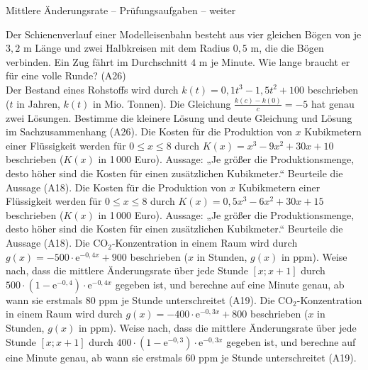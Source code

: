 \begin{aufgabe}{Mittlere Änderungsrate – Prüfungsaufgaben – weiter}
\begin{teile}
\teil Der Schienenverlauf einer Modelleisenbahn besteht aus vier gleichen Bögen von je $3{,}2$ m Länge und zwei Halbkreisen mit dem Radius $0{,}5$ m, die die Bögen verbinden. Ein Zug fährt im Durchschnitt $4$ m je Minute. Wie lange braucht er für eine volle Runde? \hfill (A26) \\ \leerfeld[min]
\teil Der Bestand eines Rohstoffs wird durch $k(t) = 0{,}1t^3 - 1{,}5t^2 + 100$ beschrieben ($t$ in Jahren, $k(t)$ in Mio. Tonnen). Die Gleichung $\frac{k(c) - k(0)}{c} = -5$ hat genau zwei Lösungen. Bestimme die kleinere Lösung und deute Gleichung und Lösung im Sachzusammenhang \hfill (A26).
\teil Die Kosten für die Produktion von $x$ Kubikmetern einer Flüssigkeit werden für $0 \le x \le 8$ durch $K(x) = x^3 - 9x^2 + 30x + 10$ beschrieben ($K(x)$ in 1\,000 Euro). Aussage: „Je größer die Produktionsmenge, desto höher sind die Kosten für einen zusätzlichen Kubikmeter.“ Beurteile die Aussage \hfill (A18).
\teil Die Kosten für die Produktion von $x$ Kubikmetern einer Flüssigkeit werden für $0 \le x \le 8$ durch $K(x) = 0{,}5x^3 - 6x^2 + 30x + 15$ beschrieben ($K(x)$ in 1\,000 Euro). Aussage: „Je größer die Produktionsmenge, desto höher sind die Kosten für einen zusätzlichen Kubikmeter.“ Beurteile die Aussage \hfill (A18).
\teil Die CO$_2$-Konzentration in einem Raum wird durch $g(x) = -500 \cdot \mathrm{e}^{-0{,}4x} + 900$ beschrieben ($x$ in Stunden, $g(x)$ in ppm). Weise nach, dass die mittlere Änderungsrate über jede Stunde $[x; x + 1]$ durch $500 \cdot (1 - \mathrm{e}^{-0{,}4}) \cdot \mathrm{e}^{-0{,}4x}$ gegeben ist, und berechne auf eine Minute genau, ab wann sie erstmals $80$ ppm je Stunde unterschreitet \hfill (A19).
\teil Die CO$_2$-Konzentration in einem Raum wird durch $g(x) = -400 \cdot \mathrm{e}^{-0{,}3x} + 800$ beschrieben ($x$ in Stunden, $g(x)$ in ppm). Weise nach, dass die mittlere Änderungsrate über jede Stunde $[x; x + 1]$ durch $400 \cdot (1 - \mathrm{e}^{-0{,}3}) \cdot \mathrm{e}^{-0{,}3x}$ gegeben ist, und berechne auf eine Minute genau, ab wann sie erstmals $60$ ppm je Stunde unterschreitet \hfill (A19).
\end{teile}
\end{aufgabe}

